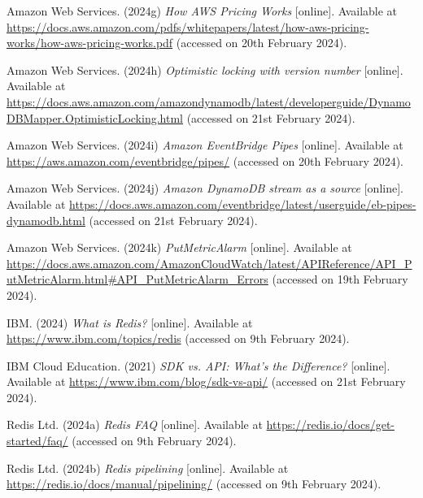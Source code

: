 \noindent Amazon Web Services. (2024g) \textit{How AWS Pricing Works} [online]. Available at \url{https://docs.aws.amazon.com/pdfs/whitepapers/latest/how-aws-pricing-works/how-aws-pricing-works.pdf} (accessed on 20th February 2024).
\vspace{0.2cm}

\noindent Amazon Web Services. (2024h) \textit{Optimistic locking with version number} [online]. Available at \url{https://docs.aws.amazon.com/amazondynamodb/latest/developerguide/DynamoDBMapper.OptimisticLocking.html} (accessed on 21st February 2024).
\vspace{0.2cm}

\noindent Amazon Web Services. (2024i) \textit{Amazon EventBridge Pipes} [online]. Available at \url{https://aws.amazon.com/eventbridge/pipes/} (accessed on 20th February 2024).
\vspace{0.2cm}

\noindent Amazon Web Services. (2024j) \textit{Amazon DynamoDB stream as a source} [online]. Available at \url{https://docs.aws.amazon.com/eventbridge/latest/userguide/eb-pipes-dynamodb.html} (accessed on 21st February 2024).
\vspace{0.2cm}

\noindent Amazon Web Services. (2024k) \textit{PutMetricAlarm} [online]. Available at \url{https://docs.aws.amazon.com/AmazonCloudWatch/latest/APIReference/API_PutMetricAlarm.html#API_PutMetricAlarm_Errors} (accessed on 19th February 2024).
\vspace{0.2cm}

\noindent IBM. (2024) \textit{What is Redis?} [online]. Available at \url{https://www.ibm.com/topics/redis} (accessed on 9th February 2024).
\vspace{0.2cm}

\noindent IBM Cloud Education. (2021) \textit{SDK vs. API: What's the Difference?} [online]. Available at \url{https://www.ibm.com/blog/sdk-vs-api/} (accessed on 21st February 2024).
\vspace{0.2cm}

\noindent Redis Ltd. (2024a) \textit{Redis FAQ} [online]. Available at \url{https://redis.io/docs/get-started/faq/} (accessed on 9th February 2024).
\vspace{0.2cm}

\noindent Redis Ltd. (2024b) \textit{Redis pipelining} [online]. Available at \url{https://redis.io/docs/manual/pipelining/} (accessed on 9th February 2024).
\vspace{0.2cm}

